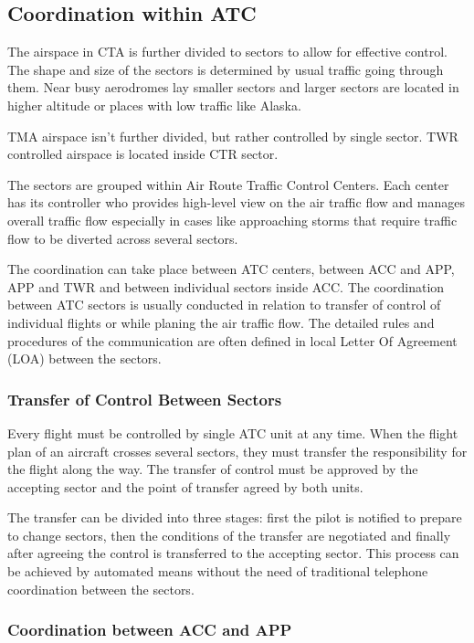 \subsection{Coordination within ATC}

The airspace in CTA is further divided to sectors to allow for effective control. The shape and size of the sectors is determined by usual traffic going through them. Near busy aerodromes lay smaller sectors and larger sectors are located in higher altitude or places with low traffic like Alaska.

TMA airspace isn't further divided, but rather controlled by single sector. TWR controlled airspace is located inside CTR sector. 

The sectors are grouped within Air Route Traffic Control Centers. Each center has its  controller who provides high-level view on the air traffic flow and manages overall traffic flow especially in cases like approaching storms that require traffic flow to be diverted across several sectors.

The coordination can take place between ATC centers, between ACC and APP, APP and TWR and between individual sectors inside ACC. The coordination between ATC sectors is usually conducted in relation to transfer of control of individual flights or while planing the air traffic flow. The detailed rules and procedures of the communication are often defined in local Letter Of Agreement (LOA) between the sectors.

\subsubsection{Transfer of Control Between Sectors}

Every flight must be controlled by single ATC unit at any time. When the flight plan of an aircraft crosses several sectors, they must transfer the responsibility for the flight along the way. The transfer of control must be approved by the accepting sector and the point of transfer agreed by both units.

The transfer can be divided into three stages: first the pilot is notified to prepare to change sectors, then the conditions of the transfer are negotiated and finally after agreeing the control is transferred to the accepting sector. This process can be achieved by automated means without the need of traditional telephone coordination between the sectors. \cite[Chapter 10]{doc4444}

\subsubsection{Coordination between ACC and APP}

